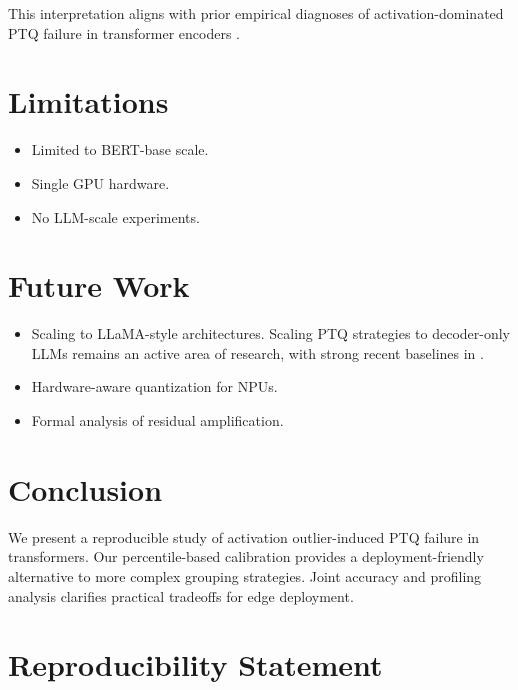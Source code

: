 \documentclass[conference]{IEEEtran}
\begin{document}
This interpretation aligns with prior empirical diagnoses of activation-dominated PTQ failure in transformer encoders \cite{bondarenko2021understanding}.

\section{Limitations}

\begin{itemize}
\item Limited to BERT-base scale.
\item Single GPU hardware.
\item No LLM-scale experiments.
\end{itemize}

\section{Future Work}

\begin{itemize}
\item Scaling to LLaMA-style architectures.
Scaling PTQ strategies to decoder-only LLMs remains an active area of research, with strong recent baselines in \cite{frantar2022gptq,xiao2023smoothquant,yao2022zeroquant}.
\item Hardware-aware quantization for NPUs.
\item Formal analysis of residual amplification.
\end{itemize}

\section{Conclusion}

We present a reproducible study of activation outlier-induced PTQ failure in transformers. Our percentile-based calibration provides a deployment-friendly alternative to more complex grouping strategies. Joint accuracy and profiling analysis clarifies practical tradeoffs for edge deployment.

\section*{Reproducibility Statement}
\end{document}
